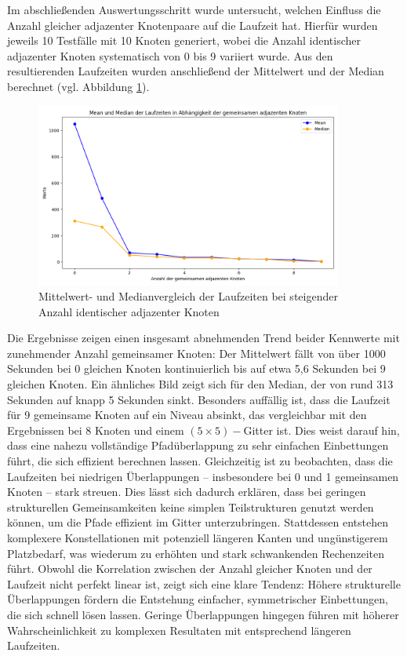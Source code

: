 \documentclass[bachelor, german]{algothesis}
\begin{document}
Im abschließenden Auswertungsschritt wurde untersucht, welchen Einfluss die Anzahl gleicher adjazenter Knotenpaare auf die Laufzeit hat. Hierfür wurden jeweils 10 Testfälle mit 10 Knoten generiert, wobei die Anzahl identischer adjazenter Knoten systematisch von 0 bis 9 variiert wurde. Aus den resultierenden Laufzeiten wurden anschließend der Mittelwert und der Median berechnet (vgl. Abbildung \ref{fig:Sim}).
\begin{figure}[H]
    \centering
    \includegraphics[width=0.9\textwidth]{figures/SimMeanMedian.png}
    \caption{Mittelwert- und Medianvergleich der Laufzeiten bei steigender Anzahl identischer adjazenter Knoten}
    \label{fig:Sim}
\end{figure}
Die Ergebnisse zeigen einen insgesamt abnehmenden Trend beider Kennwerte mit zunehmender Anzahl gemeinsamer Knoten: Der Mittelwert fällt von über 1000 Sekunden bei 0 gleichen Knoten kontinuierlich bis auf etwa 5,6 Sekunden bei 9 gleichen Knoten. Ein ähnliches Bild zeigt sich für den Median, der von rund 313 Sekunden auf knapp 5 Sekunden sinkt. Besonders auffällig ist, dass die Laufzeit für 9 gemeinsame Knoten auf ein Niveau absinkt, das vergleichbar mit den Ergebnissen bei 8 Knoten und einem $(5\times5)-$Gitter ist. Dies weist darauf hin, dass eine nahezu vollständige Pfadüberlappung zu sehr einfachen Einbettungen führt, die sich effizient berechnen lassen.\newline 
Gleichzeitig ist zu beobachten, dass die Laufzeiten bei niedrigen Überlappungen – insbesondere bei 0 und 1 gemeinsamen Knoten – stark streuen. Dies lässt sich dadurch erklären, dass bei geringen strukturellen Gemeinsamkeiten keine simplen Teilstrukturen genutzt werden können, um die Pfade effizient im Gitter unterzubringen. Stattdessen entstehen komplexere Konstellationen mit potenziell längeren Kanten und ungünstigerem Platzbedarf, was wiederum zu erhöhten und stark schwankenden Rechenzeiten führt.\newline 
Obwohl die Korrelation zwischen der Anzahl gleicher Knoten und der Laufzeit nicht perfekt linear ist, zeigt sich eine klare Tendenz: Höhere strukturelle Überlappungen fördern die Entstehung einfacher, symmetrischer Einbettungen, die sich schnell lösen lassen. Geringe Überlappungen hingegen führen mit höherer Wahrscheinlichkeit zu komplexen Resultaten mit entsprechend längeren Laufzeiten.
\end{document}
